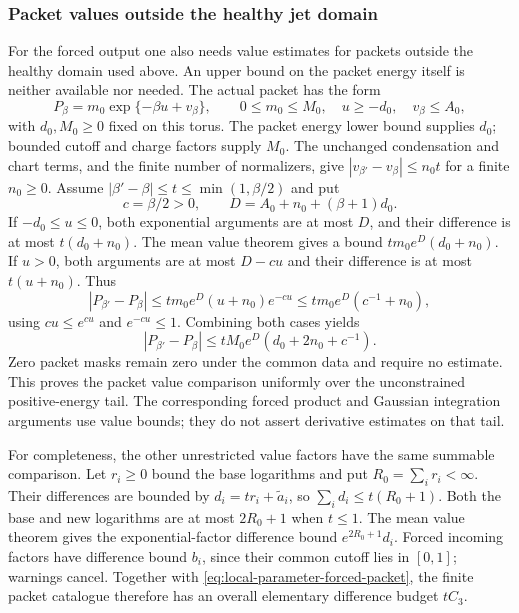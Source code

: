 \subsubsection{Packet values outside the healthy jet domain}
For the forced output one also needs value estimates for packets
outside the healthy domain used above. An upper bound on the packet
energy itself is neither available nor needed. The actual packet
has the form
\[
             P_\beta=m_0\exp\{-\beta u+v_\beta\},
 \qquad 0\le m_0\le M_0,\quad u\ge-d_0,
 \quad v_\beta\le A_0,
\]
with $d_0,M_0\ge0$ fixed on this torus. The packet energy lower
bound supplies $d_0$; bounded cutoff and charge factors supply $M_0$.
The unchanged condensation and chart terms, and the finite number
of normalizers, give
$|v_{\beta'}-v_\beta|\le n_0t$ for a finite $n_0\ge0$.
Assume $|\beta'-\beta|\le t\le\min(1,\beta/2)$ and put
\[
 c=\beta/2>0,\qquad
 D=A_0+n_0+(\beta+1)d_0.
\]
If $-d_0\le u\le0$, both exponential arguments are at most $D$,
and their difference is at most $t(d_0+n_0)$. The mean value theorem
gives a bound $t m_0 e^D(d_0+n_0)$.
If $u>0$, both arguments are at most $D-cu$ and their difference
is at most $t(u+n_0)$. Thus
\[
 |P_{\beta'}-P_\beta|
 \le t m_0e^D(u+n_0)e^{-cu}
 \le t m_0e^D(c^{-1}+n_0),
\]
using $cu\le e^{cu}$ and $e^{-cu}\le1$. Combining both cases yields
\begin{equation}\label{eq:local-parameter-forced-packet}
 |P_{\beta'}-P_\beta|
 \le tM_0e^D(d_0+2n_0+c^{-1}).
\end{equation}
Zero packet masks remain zero under the common data and require no
estimate. This proves the packet value comparison uniformly over
the unconstrained positive-energy tail. The corresponding forced
product and Gaussian integration arguments use value bounds; they
do not assert derivative estimates on that tail.

For completeness, the other unrestricted value factors have the same
summable comparison. Let $r_i\ge0$ bound the base logarithms and put
$R_0=\sum_i r_i<\infty$. Their differences are bounded by
$d_i=t r_i+\widetilde a_i$, so $\sum_i d_i\le t(R_0+1)$.
Both the base and new logarithms are at most $2R_0+1$ when $t\le1$.
The mean value theorem gives the exponential-factor difference bound
$e^{2R_0+1}d_i$. Forced incoming factors have difference bound $b_i$,
since their common cutoff lies in $[0,1]$; warnings cancel. Together
with \eqref{eq:local-parameter-forced-packet}, the finite packet
catalogue therefore has an overall elementary difference budget
$tC_3$.

